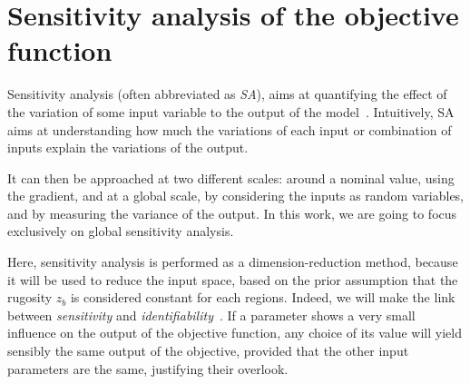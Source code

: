 \documentclass[../../Main_ManuscritThese.tex]{subfiles}
\newcommand{\zob}{z_b}
\begin{document}
\section{Sensitivity analysis of the objective function}
\label{sec:sensitivity-analysis}
Sensitivity analysis (often abbreviated as \emph{SA}), aims at
quantifying the effect of the variation of some input variable to the
output of the model~\citep{iooss_revue_2011,janon_analyse_2012}.
Intuitively, SA aims at understanding how much the variations
of each input or combination of inputs explain the variations of the
output.

It can then be approached at two different scales:
around a nominal value, using the gradient, and at a global scale, by
considering the inputs as random variables, and by measuring the
variance of the output. In this work, we are going to focus
exclusively on global sensitivity analysis.

Here, sensitivity analysis is performed as a dimension-reduction
method, because it will be used to reduce the input space, based on
the prior assumption that the rugosity $\zob$ is considered constant
for each regions. Indeed, we will make the link between
\emph{sensitivity} and
\emph{identifiability}~\citep{dobre_global_2010}. %
If a parameter shows a very small influence on the output of the
objective function, any choice of its value will yield sensibly the
same output of the objective, provided that the other input parameters
are the same, justifying their overlook.


\end{document}
